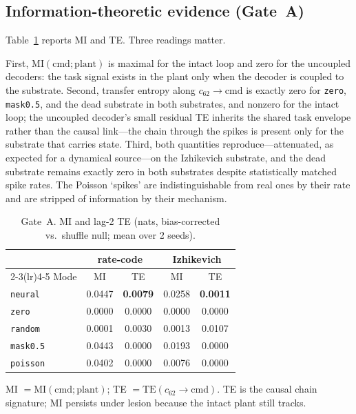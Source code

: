 \subsection{Information-theoretic evidence (Gate~A)}
\label{sec:resB}

Table~\ref{tab:gate} reports MI and TE. Three readings matter.

First, $\mathrm{MI}(\mathrm{cmd};\mathrm{plant})$ is maximal for the intact
loop and zero for the uncoupled decoders: the task signal exists in the plant
only when the decoder is coupled to the substrate. Second, transfer entropy
along $c_{62}\rightarrow\mathrm{cmd}$ is exactly zero for \texttt{zero},
\texttt{mask0.5}, and the dead substrate in both substrates, and nonzero for
the intact loop; the uncoupled decoder's small residual TE inherits the shared
task envelope rather than the causal link---the chain through the spikes is
present only for the substrate that carries state. Third, both quantities
reproduce---attenuated, as
expected for a dynamical source---on the Izhikevich substrate, and the dead
substrate remains exactly zero in both substrates despite statistically
matched spike rates. The Poisson `spikes' are indistinguishable from real ones
by their rate and are stripped of information by their mechanism.

\begin{table}[t]
\centering
\caption{Gate~A. MI and lag-2 TE (nats, bias-corrected vs.\ shuffle null;
mean over 2 seeds).}
\label{tab:gate}
\small
\begin{tabular}{lcccc}
\toprule
 & \multicolumn{2}{c}{\textbf{rate-code}} &
   \multicolumn{2}{c}{\textbf{Izhikevich}}\\
\cmidrule(lr){2-3}\cmidrule(lr){4-5}
Mode & MI & TE & MI & TE\\
\midrule
\texttt{neural} & 0.0447 & \textbf{0.0079} & 0.0258 & \textbf{0.0011}\\
\texttt{zero} & 0.0000 & 0.0000 & 0.0000 & 0.0000\\
\texttt{random} & 0.0001 & 0.0030 & 0.0013 & 0.0107\\
\texttt{mask0.5} & 0.0443 & 0.0000 & 0.0193 & 0.0000\\
\texttt{poisson} & 0.0402 & 0.0000 & 0.0076 & 0.0000\\
\bottomrule
\end{tabular}
\vspace{2pt}
\begin{flushleft}
\footnotesize
MI $=\mathrm{MI}(\mathrm{cmd};\mathrm{plant})$; TE
$= \mathrm{TE}(c_{62}\rightarrow\mathrm{cmd})$. TE is the causal chain signature;
MI persists under lesion because the intact plant still tracks.
\end{flushleft}
\end{table}

